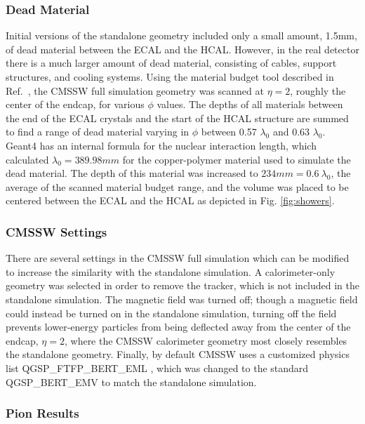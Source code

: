 \subsubsection{Dead Material}
\label{sec:newdetvaldead}

Initial versions of the standalone geometry included only a small amount, 1.5\unit{mm}, of dead material between the ECAL and the HCAL. However, in the real detector there is a much larger amount of dead material, consisting of cables, support structures, and cooling systems. Using the material budget tool described in Ref.~\cite{matbudget}, the CMSSW full simulation geometry was scanned at $\eta = 2$, roughly the center of the endcap, for various $\phi$ values. The depths of all materials between the end of the ECAL crystals and the start of the HCAL structure are summed to find a range of dead material varying in $\phi$ between 0.57 $\lambda_{0}$ and 0.63 $\lambda_{0}$. Geant4 has an internal formula for the nuclear interaction length, which calculated $\lambda_{0} = 389.98\unit{mm}$ for the copper-polymer material used to simulate the dead material. The depth of this material was increased to $234\unit{mm} = 0.6~\lambda_{0}$, the average of the scanned material budget range, and the volume was placed to be centered between the ECAL and the HCAL as depicted in Fig. \ref{fig:showers}.

\subsubsection{CMSSW Settings}
\label{sec:newdetvalcmssw}

There are several settings in the CMSSW full simulation which can be modified to increase the similarity with the standalone simulation. A calorimeter-only geometry was selected in order to remove the tracker, which is not included in the standalone simulation. The magnetic field was turned off; though a magnetic field could instead be turned on in the standalone simulation, turning off the field prevents lower-energy particles from being deflected away from the center of the endcap, $\eta = 2$, where the CMSSW calorimeter geometry most closely resembles the standalone geometry. Finally, by default CMSSW uses a customized physics list QGSP\_FTFP\_BERT\_EML \cite{calotf}, which was changed to the standard QGSP\_BERT\_EMV to match the standalone simulation.

\subsubsection{Pion Results}
\label{sec:newdetvalres}

